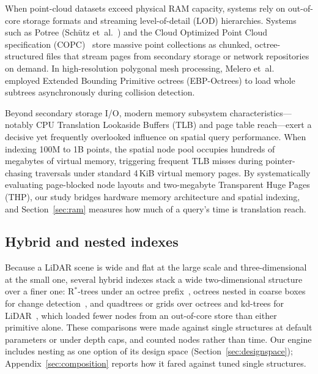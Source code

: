When point-cloud datasets exceed physical RAM capacity, systems rely on out-of-core storage formats and streaming level-of-detail (LOD) hierarchies. Systems such as Potree (Sch\"utz et~al.~\cite{schuetz2020potree}) and the Cloud Optimized Point Cloud specification (COPC)~\cite{copc2021} store massive point collections as chunked, octree-structured files that stream pages from secondary storage or network repositories on demand. In high-resolution polygonal mesh processing, Melero et~al.~\cite{melero2019ebpoctree} employed Extended Bounding Primitive octrees (EBP-Octrees) to load whole subtrees asynchronously during collision detection.

Beyond secondary storage I/O, modern memory subsystem characteristics---notably CPU Translation Lookaside Buffers (TLB) and page table reach---exert a decisive yet frequently overlooked influence on spatial query performance. When indexing 100M to 1B points, the spatial node pool occupies hundreds of megabytes of virtual memory, triggering frequent TLB misses during pointer-chasing traversals under standard 4\,KiB virtual memory pages. By systematically evaluating page-blocked node layouts and two-megabyte Transparent Huge Pages (THP), our study bridges hardware memory architecture and spatial indexing, and Section~\ref{sec:ram} measures how much of a query's time is translation reach.

\subsection{Hybrid and nested indexes}

Because a LiDAR scene is wide and flat at the large scale and three-dimensional at the small one, several hybrid indexes stack a wide two-dimensional structure over a finer one: R$^*$-trees under an octree prefix~\cite{wang2021hybridpointcloud}, octrees nested in coarse boxes for change detection~\cite{park2021nestedoctree}, and quadtrees or grids over octrees and kd-trees for LiDAR~\cite{ogayar2023nestedlidar}, which loaded fewer nodes from an out-of-core store than either primitive alone. These comparisons were made against single structures at default parameters or under depth caps, and counted nodes rather than time. Our engine includes nesting as one option of its design space (Section~\ref{sec:designspace}); Appendix~\ref{sec:composition} reports how it fared against tuned single structures.
